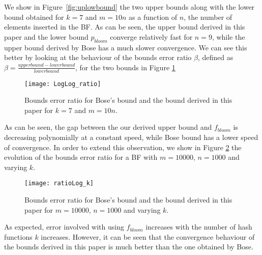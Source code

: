 We show in Figure~\ref{fig:uplowbound} the two upper bounds along with the lower bound obtained for $k=7$  and $m=10n$ as a function of $n$, the number of elements inserted in the BF. As can be seen, the upper bound derived in this paper and the lower bound $p_{bloom}$ converge relatively fast for $n=9$, while the upper bound derived by Bose has a much slower convergence. We can see this better by looking at the behaviour of the bounds error ratio $\beta$, defined as $\beta=\frac{upper bound - lower bound}{lower bound}$, for the two bounds in Figure \ref{fig:ratio}
\begin{figure}
\centering
\texttt{[image: LogLog\_ratio]}
\caption{Bounds error ratio for Bose's bound and the bound derived in this paper for $k=7$ and $m=10n$. }
\label{fig:ratio}
\end{figure}
As can be seen, the gap between the our derived upper bound and $f_{bloom}$ is decreasing polynomially at a constant speed, while Bose bound has a lower speed of convergence. In order to extend this observation, we show in Figure \ref{fig:ratiok} the evolution of the bounds error ratio for a BF with $m=10000$, $n=1000$ and varying $k$. 
\begin{figure}
\centering
\texttt{[image: ratioLog\_k]}
\caption{Bounds error ratio for Bose's bound and the bound derived in this paper for $m=10000$, $n=1000$ and varying $k$.}
\label{fig:ratiok}
\end{figure}
As expected, error involved with using $f_{bloom}$ increases with the number of hash functions $k$ increases. However, it can be seen that the convergence behaviour of the bounds derived in this paper is much better than the one obtained by Bose. 



%
%


